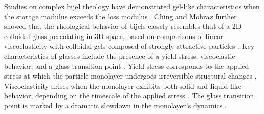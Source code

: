 Studies on complex bijel rheology have demonstrated gel-like characteristics when the storage modulus exceeds the loss modulus \cite{lee_making_2013, bai_dynamics_2015}. 
Ching and Mohraz further showed that the rheological behavior of bijels closely resembles that of a 2D colloidal glass percolating in 3D space, based on comparisons of 
linear viscoelasticity with colloidal gels composed of strongly attractive particles \cite{ching_bijel_2022}. Key characteristics of glasses include the presence of a 
yield stress, viscoelastic behavior, and a glass transition point \cite{pham_yielding_2008, weeks_introduction_2017}. Yield stress corresponds to the applied stress at 
which the particle monolayer undergoes irreversible structural changes \cite{pham_yielding_2008}. Viscoelasticity arises when the monolayer exhibits both solid and 
liquid-like behavior, depending on the timescale of the applied stress \cite{pham_yielding_2008}. The glass transition point is marked by a dramatic slowdown in the 
monolayer's dynamics \cite{weeks_introduction_2017}. 




